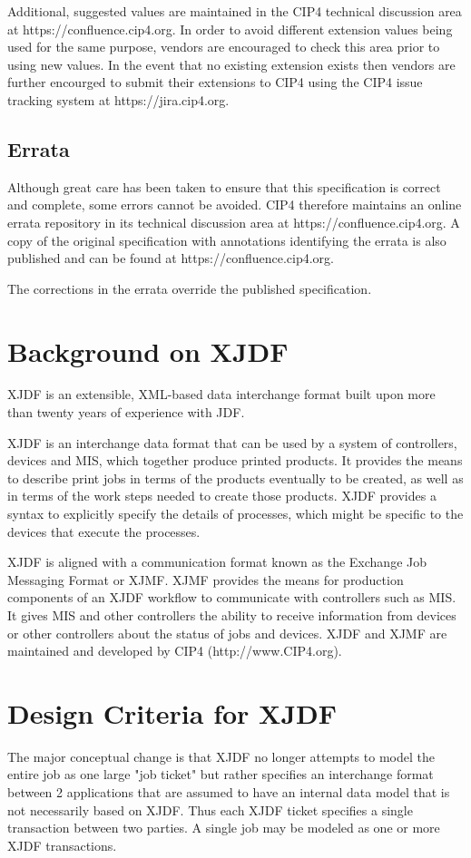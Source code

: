 Additional, suggested values are maintained in the CIP4 technical discussion area at https://confluence.cip4.org. In order to avoid different extension values being used for the same purpose, vendors are encouraged to check this area prior to using new values. In the event that no existing extension exists then vendors are further encourged to submit their extensions to CIP4 using the CIP4 issue tracking system at https://jira.cip4.org.


\subsection{Errata}
Although great care has been taken to ensure that this specification is correct and complete, some errors cannot be avoided. CIP4 therefore maintains an online errata repository in its technical discussion area at
https://confluence.cip4.org. A copy of the original specification with annotations identifying the errata is also published and can be found at https://confluence.cip4.org.

The corrections in the errata override the published specification.


\section{Background on XJDF}
XJDF is an extensible, XML-based data interchange format built upon more than twenty years of experience with JDF.

XJDF is an interchange data format that can be used by a system of controllers, devices and MIS, which together produce
printed products. It provides the means to describe print jobs in terms of the products eventually to be created, as well
as in terms of the work steps needed to create those products. XJDF provides a syntax to explicitly specify the details of
processes, which might be specific to the devices that execute the processes.

XJDF is aligned with a communication format known as the Exchange Job Messaging Format or XJMF. XJMF provides
the means for production components of an XJDF workflow to communicate with controllers such as MIS. It gives MIS
and other controllers the ability to receive information from devices or other controllers about the status of jobs and
devices. XJDF and XJMF are maintained and developed by CIP4 (http://www.CIP4.org).


\section{Design Criteria for XJDF}
The major conceptual change is that XJDF no longer attempts to model the entire job as one large "job ticket" but rather specifies an interchange format between 2 applications that are assumed to have an internal data model that is not necessarily based on XJDF. Thus each XJDF ticket specifies a single transaction between two parties. A single job may be modeled as one or more XJDF transactions.

